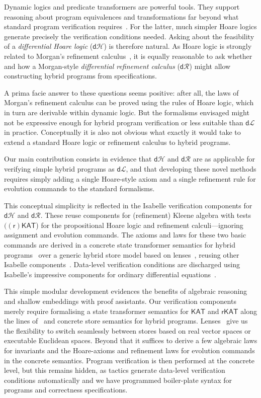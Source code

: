 \documentclass[envcountsame,envcountsect]{llncs}
\newcommand{\KAT}{\mathsf{KAT}}
\newcommand{\rKAT}{\mathsf{rKAT}}
\newcommand{\dL}{\mathsf{d}\mathcal{L}}
\newcommand{\dH}{\mathsf{d}\mathcal{H}}
\newcommand{\dR}{\mathsf{d}\mathcal{R}}
\begin{document}
Dynamic logics and predicate transformers are powerful tools. They
support reasoning about program equivalences and transformations far
beyond what standard program verification requires~\cite{BackW98}. For
the latter, much simpler Hoare logics generate precisely the
verification conditions needed.  Asking about the feasibility of a
\emph{differential Hoare logic} ($\dH$) is therefore natural.  As
Hoare logic is strongly related to Morgan's refinement
calculus~\cite{Morgan94}, it is equally reasonable to ask whether and
how a Morgan-style \emph{differential refinement calculus} ($\dR$)
might allow constructing hybrid programs from specifications.

A prima facie answer to these questions seems positive: after all, the
laws of Morgan's refinement calculus can be proved using the rules of
Hoare logic, which in turn are derivable within dynamic logic. But the
formalisms envisaged might not be expressive enough for hybrid program
verification or less suitable than $\dL$ in practice. Conceptually it
is also not obvious what exactly it would take to extend a standard
Hoare logic or refinement calculus to hybrid programs.

Our main contribution consists in evidence that $\dH$ and $\dR$ are as
applicable for verifying simple hybrid programs as $\dL$, and that
developing these novel methods requires simply adding a single
Hoare-style axiom and a single refinement rule for evolution commands
to the standard formalisms.

This conceptual simplicity is reflected in the Isabelle verification
components for $\dH$ and $\dR$. These reuse components for
(refinement) Kleene algebra with
tests~\cite{Kozen97,ArmstrongGS16,afp:vericomp} $(\mathsf{(r)KAT}$)
for the propositional Hoare logic and refinement calculi---ignoring
assignment and evolution commands. The axioms and laws for these two
basic commands are derived in a concrete state transformer semantics
for hybrid programs~\cite{afp:hybrid} over a generic hybrid
store model based on lenses~\cite{FosterZW16}, reusing other Isabelle
components~\cite{afp:hybrid,Foster18c-Optics,Foster19a-IsabelleUTP}.
Data-level verification conditions are discharged using Isabelle's
impressive components for ordinary differential
equations~\cite{ImmlerH12a}.

This simple modular development evidences the benefits of algebraic
reasoning and shallow embeddings with proof assistants. Our
verification components merely require formalising a state transformer
semantics for $\KAT$ and $\rKAT$ along the lines of~\cite{MuniveS19}
and concrete store semantics for hybrid
programs. Lenses~\cite{FosterZW16} give us the flexibility to switch
seamlessly between stores based on real vector spaces or executable
Euclidean spaces. Beyond that it suffices to derive a few algebraic
laws for invariants and the Hoare-axioms and refinement laws for
evolution commands in the concrete semantics. Program verification is
then performed at the concrete level, but this remains hidden, as
tactics generate data-level verification conditions automatically and
we have programmed boiler-plate syntax for programs and correctness
specifications.
\end{document}
